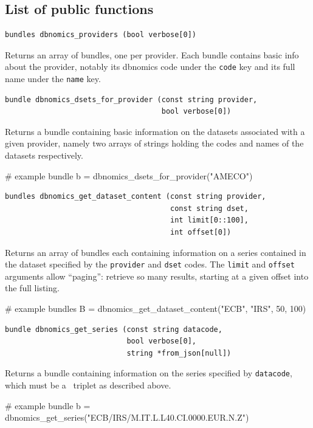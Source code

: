 \documentclass{article}
\begin{document}
\bigskip

\subsection{List of public functions}

\begin{funcdoc}
\begin{verbatim}
bundles dbnomics_providers (bool verbose[0])
\end{verbatim}
Returns an array of bundles, one per provider. Each bundle contains
basic info about the provider, notably its dbnomics code under the
\texttt{code} key and its full name under the \texttt{name} key.
\end{funcdoc}

\begin{funcdoc}
\begin{verbatim}
bundle dbnomics_dsets_for_provider (const string provider,
                                    bool verbose[0])
\end{verbatim}
  Returns a bundle containing basic information on the datasets
  associated with a given provider, namely two arrays of strings
  holding the codes and names of the datasets respectively.
\begin{code}
# example
bundle b = dbnomics_dsets_for_provider("AMECO")
\end{code}
\end{funcdoc}

\begin{funcdoc}
\begin{verbatim}
bundles dbnomics_get_dataset_content (const string provider,
                                      const string dset,
                                      int limit[0::100],
                                      int offset[0])
\end{verbatim}
Returns an array of bundles each containing information on a series
contained in the dataset specified by the \texttt{provider} and
\texttt{dset} codes. The \texttt{limit} and \texttt{offset}
arguments allow ``paging'': retrieve so many results, starting at a
given offset into the full listing.
\begin{code}
# example
bundles B = dbnomics_get_dataset_content("ECB", "IRS", 50, 100)
\end{code}
\end{funcdoc}

\begin{funcdoc}
\begin{verbatim}
bundle dbnomics_get_series (const string datacode,
                            bool verbose[0],
                            string *from_json[null])
\end{verbatim}
Returns a bundle containing information on the series specified by
\texttt{datacode}, which must be a \DB\ triplet as
described above.
\begin{code}
# example
bundle b = dbnomics_get_series("ECB/IRS/M.IT.L.L40.CI.0000.EUR.N.Z")
\end{code}
\end{funcdoc}
\end{document}
